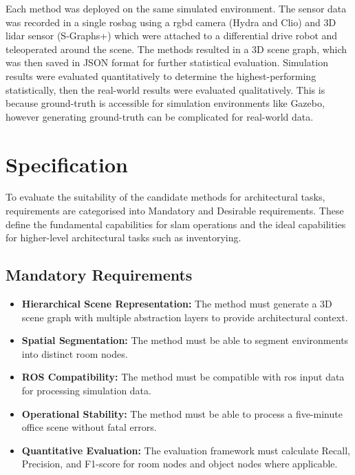 Each method was deployed on the same simulated environment. The sensor data was recorded in a single rosbag using a \acrshort{rgbd} camera (Hydra and Clio) and 3D \acrshort{lidar} sensor (S-Graphs+) which were attached to a differential drive robot and teleoperated around the scene. The methods resulted in a 3D scene graph, which was then saved in JSON format for further statistical evaluation. 
Simulation results were evaluated quantitatively to determine the highest-performing statistically, then the real-world results were evaluated qualitatively. This is because ground-truth is accessible for simulation environments like Gazebo, however generating ground-truth can be complicated for real-world data.


\section{Specification}\label{sec:specification}

To evaluate the suitability of the candidate methods for architectural tasks, requirements are categorised into Mandatory and Desirable requirements. These define the fundamental capabilities for \gls{slam} operations and the ideal capabilities for higher-level architectural tasks such as inventorying.

\subsection{Mandatory Requirements}\label{sec:spec:mandatory}

\begin{itemize}
    \item \textbf{Hierarchical Scene Representation:} The method must generate a 3D scene graph with multiple abstraction layers to provide architectural context.
    \item \textbf{Spatial Segmentation:} The method must be able to segment environments into distinct room nodes.
    \item \textbf{ROS Compatibility:} The method must be compatible with \gls{ros} input data for processing simulation data.
    \item \textbf{Operational Stability:} The method must be able to process a five-minute office scene without fatal errors.
    \item \textbf{Quantitative Evaluation:} The evaluation framework must calculate Recall, Precision, and F1-score for room nodes and object nodes where applicable.
\end{itemize}

